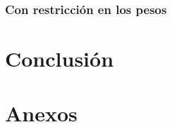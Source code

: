 \documentclass[12pt]{article}
\begin{document}
\subsubsection{Con restricción en los pesos}





\section{Conclusión}



\section{Anexos}




\newpage
 


\tableofcontents



\end{document}
